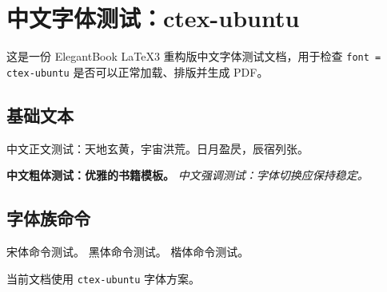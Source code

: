 \documentclass[lang = cn, font = ctex-ubuntu, mode = simple]{elegantbook-l3}
\begin{document}
\frontmatter
\tableofcontents

\mainmatter
\chapter{中文字体测试：ctex-ubuntu}

这是一份 ElegantBook LaTeX3 重构版中文字体测试文档，用于检查
\texttt{font = ctex-ubuntu} 是否可以正常加载、排版并生成 PDF。

\section{基础文本}

中文正文测试：天地玄黄，宇宙洪荒。日月盈昃，辰宿列张。

\textbf{中文粗体测试：优雅的书籍模板。}
\emph{中文强调测试：字体切换应保持稳定。}

\section{字体族命令}

{\songti 宋体命令测试。}
{\heiti 黑体命令测试。}
{\kaishu 楷体命令测试。}

\begin{theorem}[字体方案]
  当前文档使用 \texttt{ctex-ubuntu} 字体方案。
\end{theorem}
\end{document}
